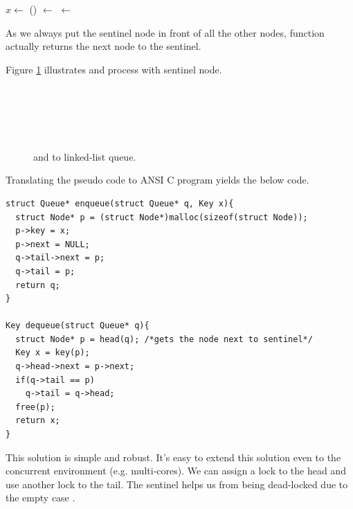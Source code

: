 \documentclass{article}
\begin{document}
\begin{algorithmic}
  \State $x \gets $ 
  \State {}() $\gets$ 
   
    \State {} $\gets$ 
  \EndIf
  \State \Return {}
\EndFunction
\end{algorithmic}

As we always put the sentinel node in front of all the other nodes,
function  actually returns the next node to the sentinel.

Figure \ref{fig:list-queue} illustrates  and  process with sentinel node.

\begin{figure}[htbp]
 \centering
  \\
  \\
  \\
  \\
 \caption{ and  to linked-list queue.} \label{fig:list-queue}
\end{figure}

Translating the pseudo code to ANSI C program yields the below code.

\begin{lstlisting}
struct Queue* enqueue(struct Queue* q, Key x){
  struct Node* p = (struct Node*)malloc(sizeof(struct Node));
  p->key = x;
  p->next = NULL;
  q->tail->next = p;
  q->tail = p;
  return q;
}

Key dequeue(struct Queue* q){
  struct Node* p = head(q); /*gets the node next to sentinel*/
  Key x = key(p);
  q->head->next = p->next;
  if(q->tail == p)
    q->tail = q->head;
  free(p);
  return x;
}
\end{lstlisting}

This solution is simple and robust. It's easy to extend this solution 
even to the concurrent environment (e.g. multi-cores). We can assign
a lock to the head and use another lock to the tail. The sentinel 
helps us from being dead-locked due to the empty case \cite{PODC96} \cite{SutterDDJ}.
\end{document}
